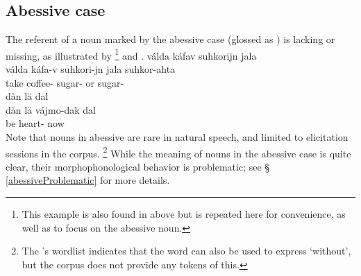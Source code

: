 \subsection{Abessive case}\label{abessive}%
The referent of a noun marked by the abessive case (glossed as \ABESSs) is lacking or missing, as illustrated by \footnote{This example is also found in  above but is repeated here for convenience, as well as to focus on the abessive noun.} 
and . 
\ea\label{abess1}
\glll	válda káfav suhkorijn jala \\
	válda káfa-v suhkori-jn jala suhkor-ahta\\
	take\BS{} coffee- sugar- or sugar-\\\nopagebreak
{} 
\z
%
\ea\label{abess2}
\glll	dån lä  dal\\
	dån lä vájmo-dak dal\\
	 be\BS{} heart- now\\\nopagebreak
{} 
\z
Note that nouns in abessive are rare in natural speech, and limited to elicitation sessions in the corpus.%
\footnote{The \WLP’s wordlist indicates that the word  can also be used to express ‘without’, but the corpus does not provide any tokens of this.} 
While the meaning of nouns in the abessive case is quite clear, their morphophonological behavior is problematic; see §\,\ref{abessiveProblematic} for more details.



